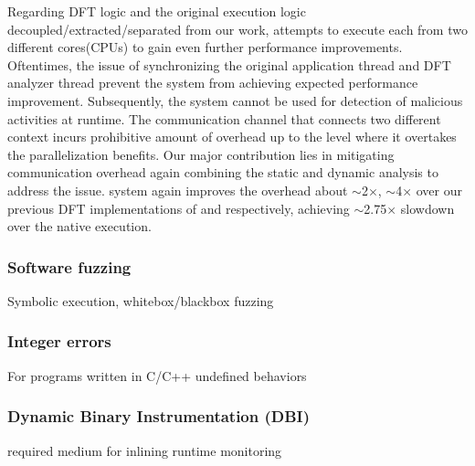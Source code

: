 \documentclass[letterpaper, 10pt]{article}
\begin{document}
\begin{small}
Regarding DFT logic and the original execution logic
decoupled/extracted/separated from our \TFA work, \SR attempts to execute each
from two different cores(CPUs) to gain even further performance improvements.
Oftentimes, the issue of synchronizing the original application thread and DFT
analyzer thread prevent the system from achieving expected performance
improvement. Subsequently, the system cannot be used for detection of malicious
activities at runtime.
%
The communication channel that connects two different context incurs
prohibitive amount of overhead up to the level where it overtakes the
parallelization benefits. Our major contribution lies in mitigating
communication overhead again combining the static and dynamic analysis to
address the issue.
%
\SR system again improves the overhead about  $\sim$2$\times$,  $\sim$4$\times$
over our previous DFT implementations of \TFA and \libdft respectively,
achieving  $\sim$2.75$\times$ slowdown over the native execution. 

\subsubsection*{Software fuzzing}
Symbolic execution, whitebox/blackbox fuzzing

\subsubsection*{Integer errors}
For programs written in C/C++ undefined behaviors

\subsubsection*{Dynamic Binary Instrumentation (DBI)}
required medium for inlining runtime monitoring 

\subsubsection*{}


\end{small}
\end{document}
